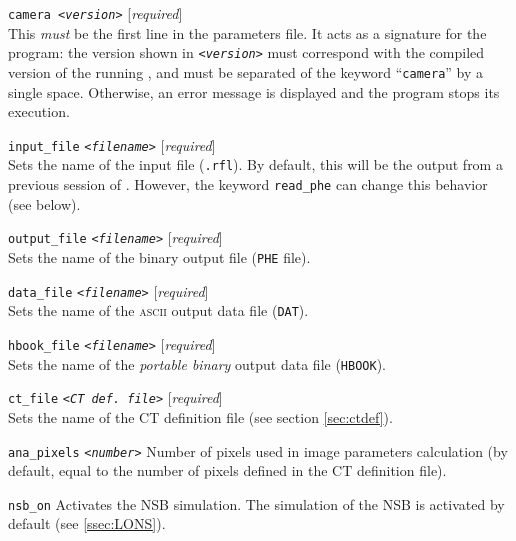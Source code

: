 \begin{Uentry}
  
\item[\texttt{camera <\emph{version}>}]
%
  [\emph{required}] \\
  This \emph{must} be the first line in the parameters file. It acts
  as a signature for the program: the version shown in
  \texttt{<\emph{version}>} must correspond with the compiled version
  of the running \camera, and must be separated of the keyword
  ``\texttt{camera}'' by a single space.  Otherwise, an error
  message is displayed and the program stops its execution.
  
\item[\texttt{input\_file} \quad
  \texttt{<\emph{filename}>}]
%
  [\emph{required}] \\
  Sets the name of the input file (\texttt{.rfl}). By default, this
  will be the output from a previous session of . However,
  the keyword \texttt{read\_phe} can change this behavior (see below).
     

\item[\texttt{output\_file} \quad
  \texttt{<\emph{filename}>}]    
%
  [\emph{required}] \\
  Sets the name of the binary output file (\texttt{PHE} file).

\item[\texttt{data\_file} \quad
  \texttt{<\emph{filename}>}]
%
  [\emph{required}] \\
  Sets the name of the \textsc{ascii} output data file (\texttt{DAT}).

\item[\texttt{hbook\_file} \quad
  \texttt{<\emph{filename}>}]
%
  [\emph{required}] \\
  Sets the name of the \emph{portable binary} output data file
  (\texttt{HBOOK}).

\item[\texttt{ct\_file} \quad
  \texttt{<\emph{CT def. file}>}]
%
  [\emph{required}] \\
  Sets the name of the CT definition file (see section
  \ref{sec:ctdef}).

\item[\texttt{ana\_pixels} \quad
  \texttt{<\emph{number}>}]
%
  Number of pixels used in image parameters calculation (by default,
  equal to the number of pixels defined in the CT definition file).

\item[\texttt{nsb\_on}]
%
  Activates the NSB simulation. The simulation of the NSB is activated
  by default (see \ref{ssec:LONS}).



\end{Uentry}
